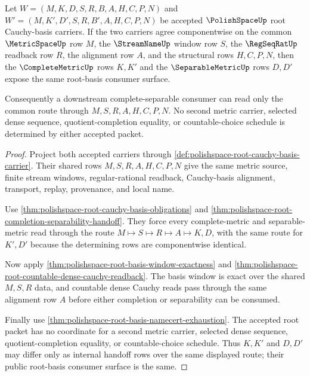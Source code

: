 \begin{theorem}
\label{thm:polishspace-root-basis-metric-separability-determinacy}
Let $W=(M,K,D,S,R,B,A,H,C,P,N)$ and $W'=(M,K',D',S,R,B',A,H,C,P,N)$ be accepted $\PolishSpaceUp$ root Cauchy-basis carriers. If the two carriers agree componentwise on the common $\MetricSpaceUp$ row $M$, the $\StreamNameUp$ window row $S$, the $\RegSeqRatUp$ readback row $R$, the alignment row $A$, and the structural rows $H,C,P,N$, then the $\CompleteMetricUp$ rows $K,K'$ and the $\SeparableMetricUp$ rows $D,D'$ expose the same root-basis consumer surface.

Consequently a downstream complete-separable consumer can read only the common route through $M,S,R,A,H,C,P,N$. No second metric carrier, selected dense sequence, quotient-completion equality, or countable-choice schedule is determined by either accepted packet.
\end{theorem}
\begin{proof}
Project both accepted carriers through \autoref{def:polishspace-root-cauchy-basis-carrier}. Their shared rows $M,S,R,A,H,C,P,N$ give the same metric source, finite stream windows, regular-rational readback, Cauchy-basis alignment, transport, replay, provenance, and local name.

Use \autoref{thm:polishspace-root-cauchy-basis-obligations} and \autoref{thm:polishspace-root-completion-separability-handoff}. They force every complete-metric and separable-metric read through the route $M \longmapsto S \longmapsto R \longmapsto A \longmapsto K,D$, with the same route for $K',D'$ because the determining rows are componentwise identical.

Now apply \autoref{thm:polishspace-root-basis-window-exactness} and \autoref{thm:polishspace-root-countable-dense-cauchy-readback}. The basis window is exact over the shared $M,S,R$ data, and countable dense Cauchy reads pass through the same alignment row $A$ before either completion or separability can be consumed.

Finally use \autoref{thm:polishspace-root-basis-namecert-exhaustion}. The accepted root packet has no coordinate for a second metric carrier, selected dense sequence, quotient-completion equality, or countable-choice schedule. Thus $K,K'$ and $D,D'$ may differ only as internal handoff rows over the same displayed route; their public root-basis consumer surface is the same.
\end{proof}

